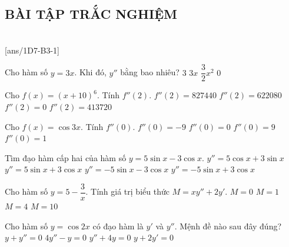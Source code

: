 \subsection{BÀI TẬP TRẮC NGHIỆM}
 \\
\setcounter{ex}{0}
[ans/1D7-B3-1]
\begin{ex}%
	Cho hàm số $ y=3x $. Khi đó, $ y'' $ bằng bao nhiêu?
	\choice
	{$3$}
	{$3x$}
	{$\displaystyle\dfrac{3}{2}x^{2}$}
	{\True $0$}
\end{ex}

\begin{ex}%
	Cho $ f(x)=(x+10)^{6} $. Tính $ f''(2) $.
	\choice
	{$f''(2) = 827440$}
	{\True $f''(2) = 622080$}
	{$ f''(2) = 0$}
	{$f''(2)=413720$}
\end{ex}

\begin{ex}%
	Cho $ f(x)=\cos 3x $. Tính $ f''(0) $.
	\choice
	{\True$ f''(0)=-9 $}
	{$ f''(0)= 0$}
	{$ f''(0)=9 $}
	{$ f''(0)= 1$}
\end{ex}

\begin{ex}%
	Tìm đạo hàm cấp hai của hàm số $y = 5\sin x - 3\cos x$.
	\choice
	{$y'' = 5\cos x + 3\sin x$}
	{$y'' = 5\sin x + 3\cos x$}
	{$y'' = - 5\sin x - 3\cos x$}
	{\True $y'' = - 5\sin x + 3\cos x$}
\end{ex}


\begin{ex}%
	Cho hàm số $y=5-\dfrac{3}{x}$. Tính giá trị biểu thức $M=xy''+2y'$.
	\choice
	{\True $M=0$}
	{$M=1$}
	{$M=4$}
	{$M=10$}
\end{ex}

\begin{ex}%
	Cho hàm số $y= \cos2x$ có đạo hàm là $y'$ và $y''$. Mệnh đề nào sau đây đúng?
	\choice
	{$y+y''=0$}
	{$4y''-y=0$}
	{\True $y''+4y=0$}
	{$y+2y'=0$}
\end{ex}

